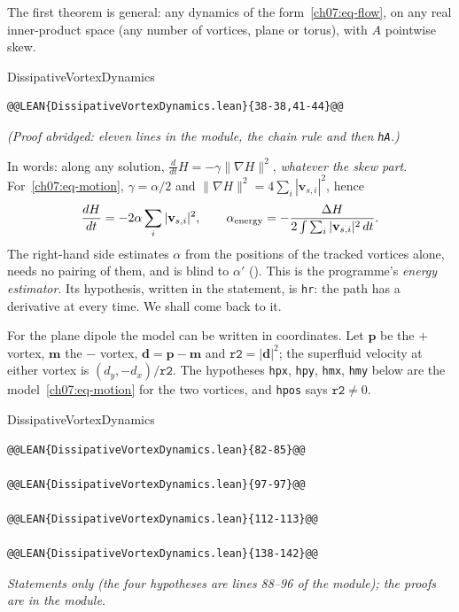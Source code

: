 The first theorem is general: any dynamics of the form~\eqref{ch07:eq-flow}, on any real inner-product space (any number of vortices, plane or torus), with $A$ pointwise skew.

\begin{leanbox}[unbreakable]{DissipativeVortexDynamics}
\begin{lstlisting}[style=lean,basicstyle=\ttfamily\footnotesize]
@@LEAN{DissipativeVortexDynamics.lean}{38-38,41-44}@@
\end{lstlisting}
\nopagebreak[4]\smallskip\noindent\textit{(Proof abridged: eleven lines in the module, the chain rule and then \texttt{hA}.)}
\end{leanbox}

In words: along any solution, $\frac{d}{dt}H=-\gamma\|\nabla H\|^2$, \emph{whatever the skew part}. For~\eqref{ch07:eq-motion}, $\gamma=\alpha/2$ and $\|\nabla H\|^2=4\sum_i|\mathbf v_{s,i}|^2$, hence
\begin{equation}
  \frac{dH}{dt}=-2\alpha\sum_i|\mathbf v_{s,i}|^2,\qquad
  \alpha_{\rm energy}=-\frac{\Delta H}{2\int\sum_i|\mathbf v_{s,i}|^2\,dt}.
  \label{ch07:eq-energy}
\end{equation}
The right-hand side estimates $\alpha$ from the positions of the tracked vortices alone, needs no pairing of them, and is blind to $\alpha'$ (). This is the programme's
\emph{energy estimator}. Its hypothesis, written in the statement, is \texttt{hr}: the path has a derivative at every time. We shall come back to it.

For the plane dipole the model can be written in coordinates. Let $\mathbf p$ be the $+$ vortex, $\mathbf m$ the $-$ vortex, $\mathbf d=\mathbf p-\mathbf m$ and $\texttt{r2}=|\mathbf d|^2$; the superfluid velocity at either vortex is $(d_y,-d_x)/\texttt{r2}$.
The hypotheses \texttt{hpx}, \texttt{hpy}, \texttt{hmx}, \texttt{hmy} below are the model~\eqref{ch07:eq-motion} for the two vortices, and \texttt{hpos} says $\texttt{r2}\neq0$.

\begin{leanbox}[unbreakable]{DissipativeVortexDynamics}
\begin{lstlisting}[style=lean,basicstyle=\ttfamily\footnotesize]
@@LEAN{DissipativeVortexDynamics.lean}{82-85}@@

@@LEAN{DissipativeVortexDynamics.lean}{97-97}@@

@@LEAN{DissipativeVortexDynamics.lean}{112-113}@@

@@LEAN{DissipativeVortexDynamics.lean}{138-142}@@
\end{lstlisting}
\nopagebreak[4]\smallskip\noindent\textit{Statements only (the four hypotheses are lines 88--96 of the module); the proofs are in the module.}
\end{leanbox}

